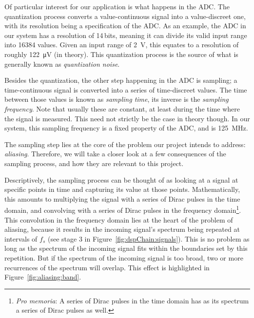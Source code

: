 Of particular  interest for our  application is  what happens in  the ADC. The
quantization process converts a  value-continuous signal into a value-discreet
one, with  its resolution  being a  specification of  the ADC. As  an example,
the  ADC  in  our  system  has a  resolution  of  \num{14}\,bits,  meaning  it
can  divide its  valid input  range  into \num{16384}  values. Given an  input
range of  \SI{2}{\volt_}, this equates  to a resolution  of roughly
\SI{122}{\micro\volt} (in theory). This quantization  process is the source of
what is generally known as \emph{quantization noise}.

Besides the quantization,  the other step happening in the  ADC is sampling; a
time-continuous signal is converted into a series of time-discreet values. The
time between those values is known as \emph{sampling time}, its inverse is the
\emph{sampling  frequency}. Note that  usually  these are  constant, at  least
during the  time where the signal  is measured. This need not  strictly be the
case  in theory  though. In our  system, this  sampling frequency  is a  fixed
property of the ADC, and is \SI{125}{\mega\hertz}.

The sampling  step lies  at the  core of  the problem  our project  intends to
address:  \emph{aliasing}. Therefore, we  will take  a  closer look  at a  few
consequences  of the  sampling  process, and  how they  are  relevant to  this
project.

Descriptively,  the  sampling process  can  be  thought  of  as looking  at  a
signal  at  specific  points  in  time   and  capturing  its  value  at  those
points. Mathematically, this amounts  to multiplying the signal  with a series
of Dirac  pulses in  the time domain,  and convolving with  a series  of Dirac
pulses in the frequency domain\footnote{%
    \emph{Pro memoria}: A series of Dirac pulses  in the time domain has as its
    spectrum a series of Dirac pulses as well.%
}.
This convolution in the  frequency domain lies at the heart  of the problem of
aliasing, because it results in  the incoming signal's spectrum being repeated
at intervals of $f_s$ (see stage 3 in Figure~\ref{fig:dspChain:signals}). This
is no problem as  long as the spectrum of the incoming  signal fits within the
boundaries set by this repetition. But if  the spectrum of the incoming signal
is  too broad,  two or  more recurrences  of the  spectrum will  overlap. This
effect is highlighted in Figure~\ref{fig:aliasing:band}.

